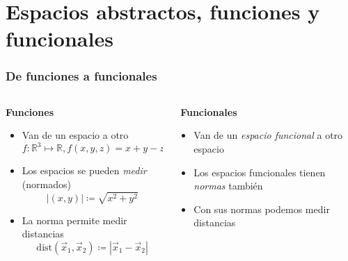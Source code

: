 \documentclass[12pt,aspectratio=169,xcolor=dvipsnames]{beamer}
\begin{document}
\section{Espacios abstractos, funciones y funcionales}
\begin{frame}\frametitle{De funciones a funcionales}

    \begin{columns}[t]
        \begin{column}[t]{0.49\textwidth}
        {\bf Funciones}
        
            \begin{itemize}
                \item<+-> Van de un espacio a otro
                    $$ f: \mathbb R^3 \mapsto \mathbb R, f(x,y,z) = x+y-z $$
                \item<+-> Los espacios se pueden \emph{medir} (normados)
                    $$ |(x,y)| \coloneqq \sqrt{x^2+y^2} $$
                \item<+-> La norma permite medir distancias
                    $$ \text{dist}( \vec x_1, \vec x_2) \coloneqq |\vec x_1 - \vec x_2| $$
            \end{itemize}
        
        \end{column}

        \vline 
        \begin{column}[t]{0.49\textwidth}
        \,\,{\bf Funcionales}

            \begin{itemize}
                \item<+-> Van de un \emph{espacio funcional} a otro espacio
                \item<+-> Los espacios funcionales tienen \emph{normas} también 
                \item<+-> Con sus normas podemos medir distancias
            \end{itemize}
        \end{column}
    \end{columns}
\end{frame}
\end{document}
